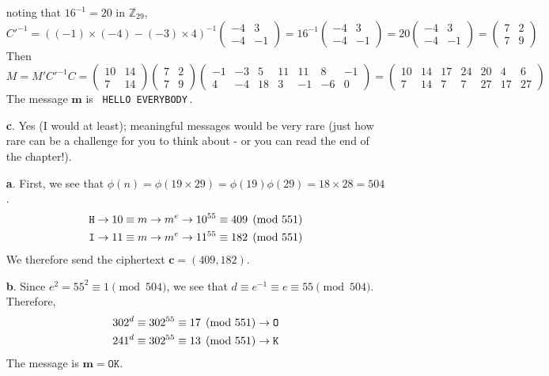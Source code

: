 \documentclass[11pt]{article}
\renewcommand{\vec}[1]{\mathbf{#1}}
\newcommand{\vc}[1]{\begin{pmatrix}#1\end{pmatrix}}
\begin{document}
\begin{itemize}
    noting that $16^{-1} = 20$ in $\mathbb{Z}_{29}$,
    \[
      C'^{-1} = ((-1)\times(-4)-(-3)\times 4)^{-1}
                  \vc{-4 &  3\\
                      -4 & -1}
              = 16^{-1}
                  \vc{-4 &  3\\
                      -4 & -1}
              = 20\vc{-4 &  3\\
                      -4 & -1}
              =   \vc{ 7 &  2\\
                       7 &  9}
    \]
    Then
    \[
      M = M'C'^{-1}C
        = \vc{10 & 14\\
               7 & 14}
          \vc{ 7 &  2\\
               7 &  9}
          \vc{-1 & -3 &  5 & 11 & 11 &  8 & -1 \\
               4 & -4 & 18 &  3 & -1 & -6 &  0 }
        = \vc{10 & 14 & 17 & 24 & 20 &  4 &  6\\
               7 & 14 &  7 &  7 & 27 & 17 & 27}
    \]
    The message $\vec{m}$ is \, {\tt HELLO EVERYBODY}\,.
  \item[{\bf c}.]
    Yes (I would at least); meaningful messages would be very rare
    (just how rare can be a challenge for you to think about - 
    or you can read the end of the chapter!).
\end{itemize}


\bigskip{}
\begin{itemize}
  \item[{\bf a}.]
    First, we see that $\phi(n) = \phi(19\times 29) = \phi(19)\phi(29) = 18\times 28 = 504$.
    \begin{align*}
      {\tt H}& \to 10\equiv m \to m^e \to 10^{55} \equiv  409\pmod{551}\\
      {\tt I}& \to 11\equiv m \to m^e \to 11^{55} \equiv  182\pmod{551}
    \end{align*}
    We therefore send the ciphertext $\vec{c} = (409,182)$.
  \item[{\bf b}.]
    Since $e^2 = 55^2 \equiv 1\pmod{504}$,
    we see that $d \equiv e^{-1}\equiv e\equiv 55\pmod{504}$.
    Therefore,
    \begin{align*}
      302^d &\equiv 302^{55} \equiv 17 \pmod{551} \to {\tt O}\\
      241^d &\equiv 302^{55} \equiv 13 \pmod{551} \to {\tt K}
    \end{align*}
    The message is $\vec{m} = \texttt{OK}$.
\end{itemize}
\end{document}
